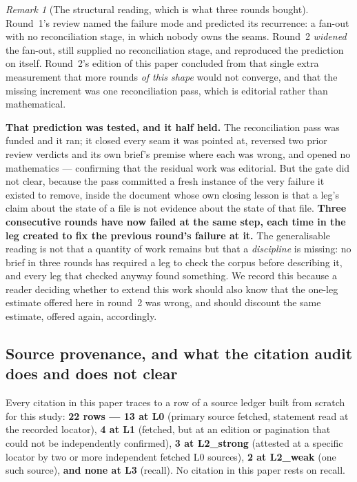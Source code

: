 \documentclass[11pt,a4paper]{article}
\theoremstyle{plain}
\theoremstyle{definition}
\theoremstyle{remark}
\newtheorem{remark}[theorem]{Remark}
\begin{document}
\begin{remark}[The structural reading, which is what three rounds bought]
\label{rem:structural}
Round~1's review named the failure mode and predicted its recurrence: a fan-out with no
reconciliation stage, in which nobody owns the seams. Round~2 \emph{widened} the fan-out, still
supplied no reconciliation stage, and reproduced the prediction on itself. Round~2's edition of
this paper concluded from that single extra measurement that more rounds \emph{of this shape}
would not converge, and that the missing increment was one reconciliation pass, which is
editorial rather than mathematical.

\textbf{That prediction was tested, and it half held.} The reconciliation pass was funded and
it ran; it closed every seam it was pointed at, reversed two prior review verdicts and its own
brief's premise where each was wrong, and opened no mathematics --- confirming that the
residual work was editorial. But the gate did not clear, because the pass committed a fresh
instance of the very failure it existed to remove, inside the document whose own closing lesson
is that a leg's claim about the state of a file is not evidence about the state of that file.
\textbf{Three consecutive rounds have now failed at the same step, each time in the leg created
to fix the previous round's failure at it.} The generalisable reading is not that a quantity of
work remains but that a \emph{discipline} is missing: no brief in three rounds has required a
leg to check the corpus before describing it, and every leg that checked anyway found something.
We record this because a reader deciding whether to extend this work should also know that the
one-leg estimate offered here in round~2 was wrong, and should discount the same estimate,
offered again, accordingly.
\end{remark}

\subsection{Source provenance, and what the citation audit does and does not clear}
\label{sec:provenance}

Every citation in this paper traces to a row of a source ledger built from scratch for this
study: \textbf{22 rows --- 13 at L0} (primary source fetched, statement read at the recorded
locator), \textbf{4 at L1} (fetched, but at an edition or pagination that could not be
independently confirmed), \textbf{3 at L2\_strong} (attested at a specific locator by two or
more independent fetched L0 sources), \textbf{2 at L2\_weak} (one such source),
\textbf{and none at L3} (recall). No citation in this paper rests on recall.
\end{document}
